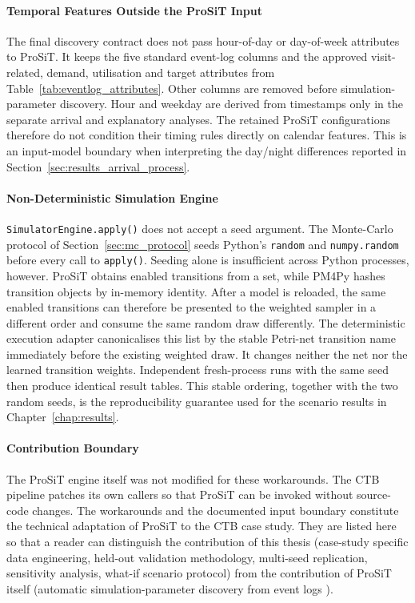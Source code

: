 \paragraph{Temporal Features Outside the ProSiT Input}

The final discovery contract does not pass hour-of-day or day-of-week
attributes to ProSiT. It keeps the five standard event-log columns and the
approved visit-related, demand, utilisation and target attributes from
Table~\ref{tab:eventlog_attributes}. Other columns are removed before
simulation-parameter discovery. Hour and weekday are derived from timestamps
only in the separate arrival and explanatory analyses. The retained ProSiT
configurations therefore do not condition their timing rules directly on
calendar features. This is an input-model boundary when interpreting the
day/night differences reported in Section~\ref{sec:results_arrival_process}.

\paragraph{Non-Deterministic Simulation Engine}

\texttt{SimulatorEngine.apply()} does not accept a seed argument. The
Monte-Carlo protocol of Section~\ref{sec:mc_protocol} seeds
Python's \texttt{random} and \texttt{numpy.random} before every call to
\texttt{apply()}. Seeding alone is insufficient across Python processes,
however. ProSiT obtains enabled transitions from a set, while PM4Py hashes
transition objects by in-memory identity. After a model is reloaded, the same
enabled transitions can therefore be presented to the weighted sampler in a
different order and consume the same random draw differently. The deterministic
execution adapter canonicalises this list by the stable Petri-net transition name
immediately before the existing weighted draw. It changes neither the net nor
the learned transition weights. Independent fresh-process runs with the same
seed then produce identical result tables. This stable ordering, together with
the two random seeds, is the reproducibility guarantee used for the scenario
results in Chapter~\ref{chap:results}.

\paragraph{Contribution Boundary}

The ProSiT engine itself was not modified for these workarounds. The
CTB pipeline patches its own callers so that ProSiT can be invoked
without source-code changes. The workarounds and the documented input boundary
constitute the technical adaptation of ProSiT to the CTB case study. They are
listed here so that a reader can distinguish the contribution of this
thesis (case-study specific data engineering, held-out validation
methodology, multi-seed replication, sensitivity analysis, what-if
scenario protocol) from the contribution of ProSiT itself (automatic simulation-parameter discovery from event logs \cite{Vinci2026prosit}).
